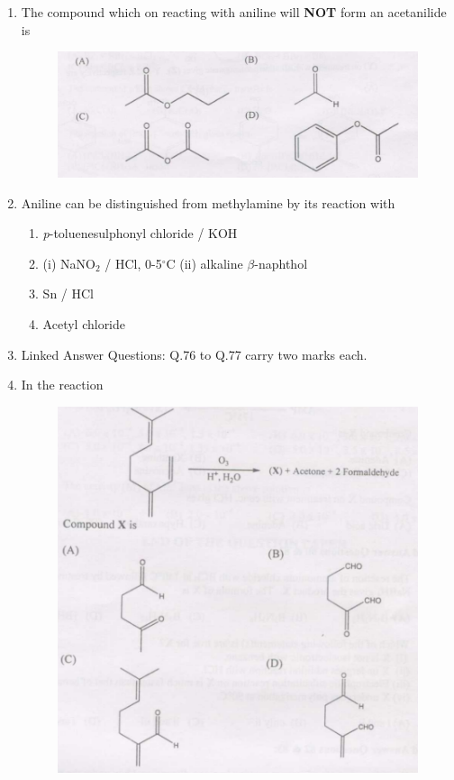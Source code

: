 \documentclass[journal,12pt,onecolumn]{IEEEtran}
\theoremstyle{remark}
\begin{document}
\begin{enumerate}
\item  The compound which on reacting with aniline will \textbf{NOT} form an acetanilide is \hfill{}
\begin{figure}
    \centering
    \includegraphics[width=0.5\columnwidth]{figs/image13.png}
    \caption{}
    \label{fig:figure13}
\end{figure}

  

\item  Aniline can be distinguished from methylamine by its reaction with \hfill{}

\begin{multicols}{2}
\begin{enumerate} 
\item \textit{p}-toluenesulphonyl chloride / KOH
\item (i) NaNO$_2$ / HCl, 0-5$^\circ$C \quad (ii) alkaline $\beta$-naphthol
\item Sn / HCl
\item Acetyl chloride
\end{enumerate}
\end{multicols}

\item{Linked Answer Questions: Q.76 to Q.77 carry two marks each.}

\item  In the reaction \hfill{}
\begin{figure}
    \centering
    \includegraphics[width=0.5\columnwidth]{figs/image14.png}
    \caption{}
    \label{fig:figure14}
\end{figure}


\end{enumerate}
\end{document}
